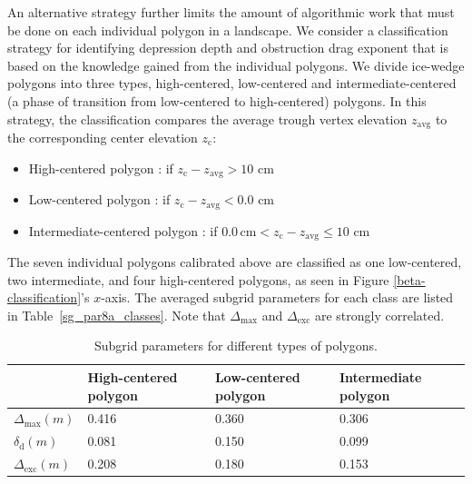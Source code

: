 An alternative strategy further limits the amount of algorithmic work that must be done on each individual polygon in a landscape.  
We consider a classification strategy for identifying depression depth and obstruction drag exponent that is based on the knowledge gained from the individual polygons.
We divide ice-wedge polygons into three types, high-centered, low-centered and intermediate-centered (a phase of transition from low-centered to high-centered) polygons. 
In this strategy, the classification compares the average trough vertex elevation $z_\text{avg}$ to the corresponding center elevation $z_\text{c}$:
%
\begin{itemize}
\item High-centered polygon : if $z_\text{c} - z_\text{avg} > 10$ cm
\item Low-centered polygon : if $z_\text{c} - z_\text{avg} < 0.0$ cm
\item Intermediate-centered polygon : if $ 0.0 \, \text{cm} <  z_\text{c} - z_\text{avg} \leq 10$ cm
\end{itemize}
%
The seven individual polygons calibrated above are classified as one low-centered, two intermediate, and four high-centered polygons, as seen in Figure \ref{beta-classification}'s $x$-axis.
The averaged subgrid parameters for each class are listed in Table~\ref{sg_par8a_classes}.
Note that $\Delta_\text{max}$ and $\Delta_\text{exc}$ are strongly correlated.
%
\begin{table}[!h]
\centering
\caption{Subgrid parameters for different types of polygons.}
\begin{tabular}{|p{}|p{2.5cm}|p{2.5cm}|p{2.5cm}|} 
\hline
 & High-centered polygon & Low-centered polygon & Intermediate polygon \\ \hline
$\Delta_\text{max}(m)$ & 0.416 & 0.360 & 0.306  \\
$\delta_\text{d}(m)$ & 0.081 & 0.150 & 0.099 \\
$\Delta_\text{exc}(m)$ & 0.208 & 0.180 & 0.153  \\ \hline
\end{tabular}
\label{sg_para_classes}
\end{table}

